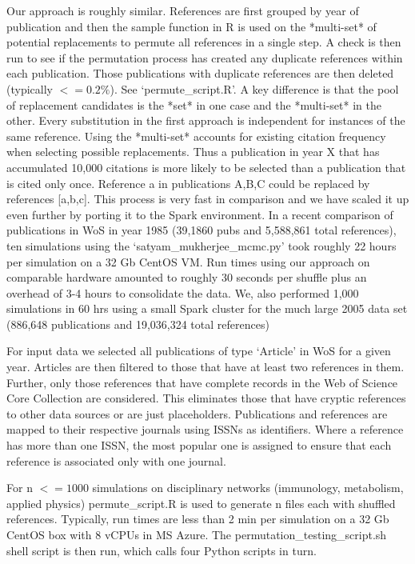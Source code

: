 \documentclass{article}
\begin{document}
Our approach is roughly similar. References are first grouped by year of publication and then the sample function in R is used on the *multi-set* of potential replacements to permute all references in a single step. A check is then run to see if the permutation process has created any duplicate references within each publication. Those publications with duplicate references are then deleted (typically $<= 0.2\%$). See `permute\_script.R'.  A key difference is that the pool of replacement candidates is the *set* in one case and the *multi-set* in the 
other. Every substitution in the first approach is independent for instances of the same reference. Using the *multi-set* accounts for existing citation frequency when selecting possible replacements. Thus a publication in year X that has accumulated 10,000 citations is more likely to be selected than a publication that is cited only once. Reference a in publications A,B,C could be replaced by references [a,b,c]. This process is very fast in comparison and we have scaled it up even further by porting it to the Spark environment. In a recent comparison of publications in WoS in year 1985 (39,1860 pubs and 5,588,861 total references), ten simulations using the `satyam\_mukherjee\_mcmc.py' took roughly 22 hours per simulation on a 32 Gb CentOS VM. Run times using our approach on comparable hardware amounted to roughly 30 seconds per shuffle plus an overhead of 3-4 hours to consolidate the data. We, also performed 1,000 simulations in 60 hrs using a small Spark cluster for the much large 2005 data set (886,648 publications and 19,036,324 total references)

For input data we selected all publications of type `Article' in WoS for a given year. Articles are then filtered to those that have at least two references in them. Further, only those references that have complete records in the Web of Science Core Collection are considered. This eliminates those that have cryptic references to other data sources or are just placeholders. Publications and references are mapped to their respective journals using ISSNs as identifiers. Where a reference has more than one ISSN, the most popular one is assigned to ensure that each reference is associated only with one journal.

For n $<= 1000$ simulations on disciplinary networks (immunology, metabolism, applied physics) permute\_script.R is 
used to generate n files each with shuffled references. Typically, run times are less than 2 min per simulation on a 32 Gb CentOS box with 8 vCPUs in MS Azure. The permutation\_testing\_script.sh shell script is then run, which calls four Python scripts in turn. 
\end{document}

